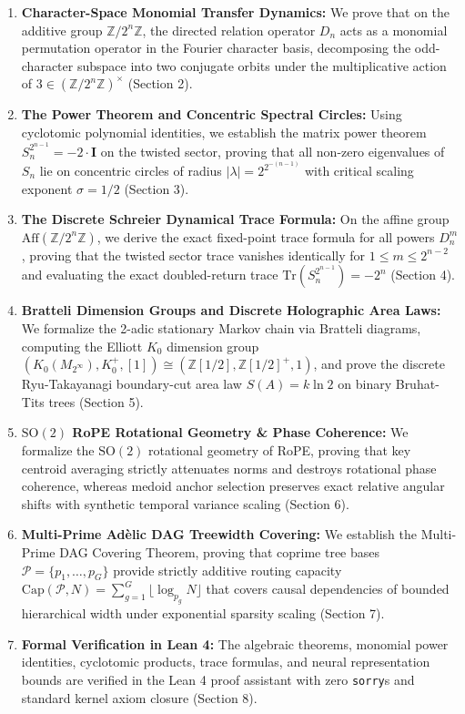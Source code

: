 \documentclass[11pt,reqno]{article}
\theoremstyle{plain}
\theoremstyle{definition}
\theoremstyle{remark}
\newcommand{\Z}{\mathbb{Z}}
\newcommand{\Aff}{\mathrm{Aff}}
\newcommand{\Tr}{\mathrm{Tr}}
\newcommand{\Capac}{\mathrm{Cap}}
\begin{document}
\begin{enumerate}
    \item \textbf{Character-Space Monomial Transfer Dynamics:} We prove that on the additive group $\Z/2^n\Z$, the directed relation operator $D_n$ acts as a monomial permutation operator in the Fourier character basis, decomposing the odd-character subspace into two conjugate orbits under the multiplicative action of $3 \in (\Z/2^n\Z)^\times$ (Section 2).
    \item \textbf{The Power Theorem and Concentric Spectral Circles:} Using cyclotomic polynomial identities, we establish the matrix power theorem $S_n^{2^{n-1}} = -2 \cdot \mathbf{I}$ on the twisted sector, proving that all non-zero eigenvalues of $S_n$ lie on concentric circles of radius $|\lambda| = 2^{2^{-(n-1)}}$ with critical scaling exponent $\sigma = 1/2$ (Section 3).
    \item \textbf{The Discrete Schreier Dynamical Trace Formula:} On the affine group $\Aff(\Z/2^n\Z)$, we derive the exact fixed-point trace formula for all powers $D_n^m$, proving that the twisted sector trace vanishes identically for $1 \le m \le 2^{n-2}$ and evaluating the exact doubled-return trace $\Tr(S_n^{2^{n-1}}) = -2^n$ (Section 4).
    \item \textbf{Bratteli Dimension Groups and Discrete Holographic Area Laws:} We formalize the 2-adic stationary Markov chain via Bratteli diagrams, computing the Elliott $K_0$ dimension group $(K_0(M_{2^\infty}), K_0^+, [1]) \cong (\Z[1/2], \Z[1/2]^+, 1)$, and prove the discrete Ryu-Takayanagi boundary-cut area law $S(A) = k \ln 2$ on binary Bruhat-Tits trees (Section 5).
    \item \textbf{$\mathrm{SO}(2)$ RoPE Rotational Geometry \& Phase Coherence:} We formalize the $\mathrm{SO}(2)$ rotational geometry of RoPE, proving that key centroid averaging strictly attenuates norms and destroys rotational phase coherence, whereas medoid anchor selection preserves exact relative angular shifts with synthetic temporal variance scaling (Section 6).
    \item \textbf{Multi-Prime Adèlic DAG Treewidth Covering:} We establish the Multi-Prime DAG Covering Theorem, proving that coprime tree bases $\mathcal{P} = \{p_1, \dots, p_G\}$ provide strictly additive routing capacity $\Capac(\mathcal{P}, N) = \sum_{g=1}^G \lfloor \log_{p_g} N \rfloor$ that covers causal dependencies of bounded hierarchical width under exponential sparsity scaling (Section 7).
    \item \textbf{Formal Verification in Lean 4:} The algebraic theorems, monomial power identities, cyclotomic products, trace formulas, and neural representation bounds are verified in the Lean 4 proof assistant with zero \texttt{sorry}s and standard kernel axiom closure (Section 8).
\end{enumerate}
\end{document}
